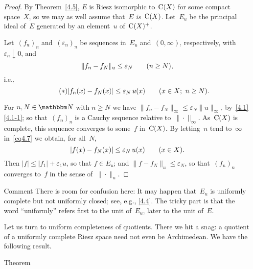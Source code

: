 \documentclass[main.tex]{subfiles}
\begin{document}
\begin{proof}
By Theorem~\ref{4.5},
$E$ is Riesz isomorphic to~$\mathrm{C}(X)$
for some compact space~$X$,
so we may as well assume that~$E$ \emph{is}~$\mathrm{C}(X)$.
Let~$E_u$ be the principal ideal of~$E$
generated by an element~$u$ of~$\mathrm{C}(X)^+$.

Let~$(f_n)_n$ and~$(\varepsilon_n)_n$
be sequences in~$E_u$ and~$(0,\infty)$,
respectively,
with $\varepsilon_n\downarrow 0$, and
\begin{equation*}
\| f_n - f_N \|_u \leq \varepsilon_N \qquad (n\geq N)\text{,}
\end{equation*}
i.e.,
\begin{equation*}
\label{eq4.7} \tag{$*$}
|f_n(x)-f_N(x)|\leq \varepsilon_N \,u(x) \qquad (x\in X;\ n\geq N)\text{.}
\end{equation*}

For $n,N\in\N$ with $n\geq N$
we have $\|f_n-f_N\|_\infty \leq \varepsilon_N \|u\|_\infty$,
by~\ref{4.1}\ref{4.1-1};
so that~$(f_n)_n$ is a Cauchy sequence relative to~$\|\cdot\|_\infty$.
As~$\mathrm{C}(X)$ is complete,
this sequence converges to some~$f$ in~$\mathrm{C}(X)$.
By letting~$n$ tend to~$\infty$
in~\eqref{eq4.7} we obtain,
for all~$N$,
\begin{equation*}
|f(x)-f_N(x)|\leq\varepsilon_N\,u(x)\qquad(x\in X)\text{.}
\end{equation*}
Then $|f|\leq |f_1|+\varepsilon_1 u$,
so that $f\in E_u$;
and $\| f - f_N\|_u\leq \varepsilon_N$,
so that~$(f_n)_n$
converges to~$f$ in the sense of~$\|\cdot\|_u$. \xqed
\end{proof}
%
%
\begin{psec}{4.8}{Comment}
There is room for confusion here:
It may happen that~$E_u$ is uniformly complete
but not uniformly closed;
see, e.g., \ref{4.4}.
The tricky part is that the word ``uniformly''
refers first to the unit of~$E_u$,
later to the unit of~$E$.
\end{psec}
%
%
\noindent
Let us turn to uniform completeness of quotients.
There we hit a snag:
a quotient of a uniformly complete Riesz space
need not even be Archimedean.
We have the following result.
\begin{psec}{4.9}{Theorem}
\end{psec}
\end{document}
